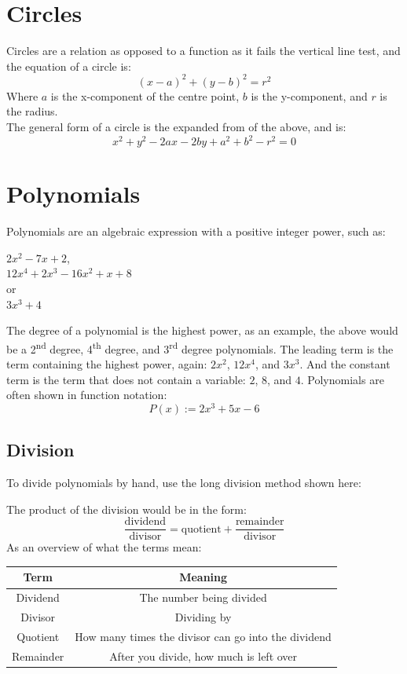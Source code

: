 \documentclass{book}
\begin{document}
\chapter{Circles}
Circles are a relation as opposed to a function as it fails the vertical line test, and the equation of a circle is:
\[
	(x - a)^2 + (y - b)^2 = r^2
\]
Where $a$ is the x-component of the centre point,  $b$ is the y-component, and $r$ is the radius.\\

The general form of a circle is the expanded from of the above, and is:
\[
	x^2 + y^2 - 2ax - 2by + a^2 + b^2 -r^2 = 0
\]

\chapter{Polynomials}
Polynomials are an algebraic expression with a positive integer power, such as:
\begin{center}
	$2x^2 - 7x + 2$,\\
	$12x^4 + 2x^3 - 16x^2 + x + 8$\\
	or\\
	$3x^3 + 4$
\end{center}
The degree of a polynomial is the highest power, as an example, the above would be a 2\textsuperscript{nd} degree, 4\textsuperscript{th} degree, and 3\textsuperscript{rd} degree polynomials.  The leading term is the term containing the highest power, again: $2x^2$, $12x^4$, and $3x^3$.  And the constant term is the term that does not contain a variable: $2$, $8$, and $4$.  Polynomials are often shown in function notation:
\[
	P(x) := 2x^3 + 5x - 6
\]

\section{Division}
To divide polynomials by hand, use the long division method shown here:
\begin{center}
\end{center}


The product of the division would be in the form:
\[
	\frac{\text{dividend}}{\text{divisor}} = \text{quotient} + \frac{\text{remainder}}{\text{divisor}}
\]
As an overview of what the terms mean:
\begin{center}
	\begin{tabular}{c|c}
		Term      & Meaning                                             \\ \hline
		Dividend  & The number being divided                            \\
		Divisor   & Dividing by                                         \\
		Quotient  & How many times the divisor can go into the dividend \\
		Remainder & After you divide, how much is left over
	\end{tabular}
\end{center}
\end{document}
